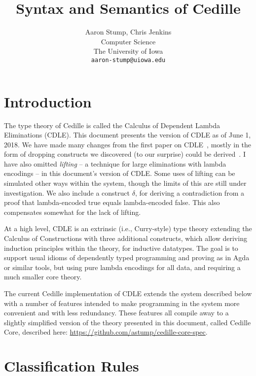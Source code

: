 \documentclass{article}
\begin{document}
\title{Syntax and Semantics of Cedille}

\author{Aaron Stump, Chris Jenkins \\
  Computer Science \\
  The University of Iowa \\
\texttt{aaron-stump@uiowa.edu}}

\date{}

\maketitle

\section{Introduction}

The type theory of Cedille is called the Calculus of Dependent Lambda
Eliminations (CDLE).  This document presents the version of CDLE as of
June 1, 2018.  We have made many changes from the first paper on CDLE~\cite{stump17},
mostly in the form of dropping constructs we discovered (to our
surprise) could be derived~\cite{stump18}. I have also omitted
\emph{lifting} -- a technique for large eliminations with lambda
encodings -- in this document's version of CDLE.  Some uses of lifting
can be simulated other ways within the system, though the limits of
this are still under investigation.  We also include a construct
$\delta$, for deriving a contradiction from a proof that
lambda-encoded true equals lambda-encoded false.  This also
compensates somewhat for the lack of lifting.

At a high level, CDLE is an extrinsic (i.e., Curry-style) type theory
extending the Calculus of Constructions with three additional
constructs, which allow deriving induction principles within the
theory, for inductive datatypes.  The goal is to support usual
idioms of dependently typed programming and proving as in Agda or
similar tools, but using pure lambda encodings for all data, and
requiring a much smaller core theory.

The current Cedille implementation of CDLE extends the system
described below with a number of features intended to make programming
in the system more convenient and with less redundancy.  These
features all compile away to a slightly simplified version of the
theory presented in this document, called Cedille Core, described
here: \url{https://github.com/astump/cedille-core-spec}.

\section{Classification Rules}
\end{document}
